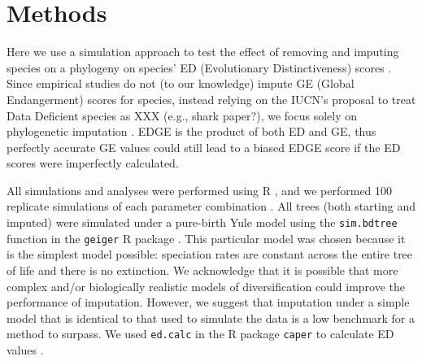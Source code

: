 \documentclass[12pt,english]{article}
\begin{document}
\section*{Methods}

Here we use a simulation approach to test the effect of removing and imputing
species on a phylogeny on species' ED (Evolutionary Distinctiveness) scores
. Since empirical studies do not (to our knowledge) impute GE (Global
Endangerment) scores for species, instead relying on the IUCN's proposal to treat Data Deficient species as XXX (e.g., shark paper?), we focus solely on phylogenetic imputation
. EDGE is
the product of both ED and GE, thus perfectly accurate GE values could still lead to a  biased EDGE score
if the ED scores were imperfectly calculated.

All simulations and analyses were performed using R \autocite[version
3.4.0;][]{R2017}, and we performed 100 replicate simulations of each parameter combination
. All trees (both starting and imputed) were
simulated under a pure-birth Yule model using the \texttt{sim.bdtree} function
in the \texttt{geiger} R package \autocite[wrong citation; there's a newer one with Matt Pennell as the first author][]{Harmon2007}.
This particular model was
chosen because it is the simplest model possible: speciation rates are constant across the entire tree of life and there is no extinction.
We acknowledge that it is possible that more complex and/or
biologically realistic models of diversification could improve the
performance of imputation. However, we suggest that imputation under a
simple model that is identical to that used to simulate the data is
a low benchmark for a method to surpass.
We used \texttt{ed.calc} in the R package \texttt{caper}
to calculate ED values \autocite{Orme2013}.
\end{document}
